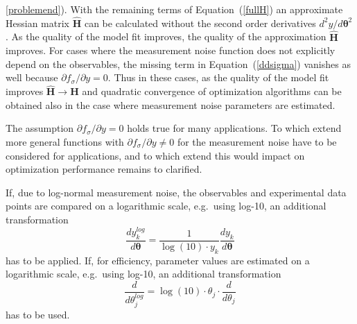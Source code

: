\documentclass[12pt,a4paper]{scrartcl}
\newcommand{\DD}[2]{\frac{d #1}{d #2}}
\begin{document}
\ref{problemend}). With the remaining terms of Equation~(\ref{fullH}) an approximate 
Hessian matrix $\mathbf{\hat H}$ can be calculated without the second order derivatives 
$d^2 {y}/d \boldsymbol{\theta}^2$. As the quality of the model fit improves, the quality of 
the approximation $\mathbf{\hat H}$ improves. For cases where the measurement noise 
function does not explicitly depend on the observables, the missing term in 
Equation~(\ref{ddsigma}) vanishes as well because $\partial f_\sigma / \partial y= 0$. Thus 
in these cases, as the quality of the model fit improves $\mathbf{\hat H} \rightarrow 
\mathbf{H}$ and quadratic convergence of optimization algorithms can be obtained also in 
the case where measurement noise parameters are estimated. 

The assumption $\partial f_\sigma / \partial y = 0$ holds true for many applications. To 
which extend more general functions with $\partial f_\sigma / \partial y \not= 0$ for the 
measurement noise have to be considered for applications, and to which extend this 
would impact on optimization performance remains to clarified.

If, due to log-normal measurement noise, the observables and experimental data points 
are compared on a logarithmic scale, e.g.~using log-10, an additional transformation
\begin{equation}
	\DD{y_k^{log}}{\boldsymbol{\theta}} =  \frac{1}{\log(10) \cdot y_k}\DD{y_k}
{\boldsymbol{\theta}}
\end{equation}
has to be applied. 
If, for efficiency, parameter values are estimated on a logarithmic scale, e.g.~using log-10, 
an additional transformation
\begin{equation}
	\DD{}{\theta_j^{log}} = \log(10)\cdot \theta_j \cdot \DD{}{\theta_j}
\end{equation}
has to be used. 
\end{document}
